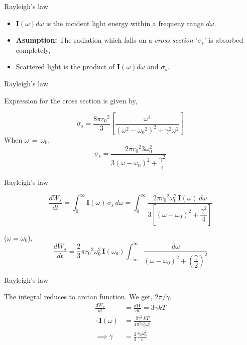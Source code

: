 \documentclass[aspectratio=169]{beamer}
\begin{document}
\begin{frame}{Rayleigh's law}
	
	\begin{itemize}
		
		\item  $ \mathbf{I}(\omega)d\omega $ is the incident light energy within a frequeny range $d\omega$. \newline
		\item \textbf{Asumption:} The radiation which falls on a \textit{cross section} '$\sigma_s$' is absorbed completely, \newline
		\item Scattered light is the product of $ \mathbf{I}(\omega)d\omega $ and $ \sigma_s $.

	\end{itemize}
	
\end{frame}
			
\begin{frame}{Rayleigh's law}
	\begin{center}
		Expression for the cross section is given by,
	\end{center}
	
	{\large \[ \sigma_s = \frac{8\pi {r_0}^{2}}{3} \left[ \frac{\omega^{4}}{(\omega^2-{\omega_0}^{2})^2+\gamma^2 \omega^2}\right] \]}\newline
	When $ \omega\,=\,\omega_0 $, \newline 		
	{\large \[ \sigma_s = \frac{2\pi {r_0}^{2}{3} \omega_0^{2}}{3(\omega-\omega_0)^2+\dfrac{\gamma^2}{4}} \]}
	
\end{frame}
				
\begin{frame}{Rayleigh's law}

	\[ \frac{dW_s}{dt}=\int_0^{\infty}{\mathbf{I}(\omega)\,\sigma_s \, d\omega} = \int_0^{\infty}{\frac{2\pi {r_0}^{2} \omega_0^{2} \, \mathbf{I}(\omega)\, d\omega}{3 \left[ (\omega-\omega_0)^2+\dfrac{\gamma^2}{4} \right] }} \] \newline

	 \because ($\omega =\omega_0 $), 
	\[ \frac{dW_s}{dt}= \frac{2}{3}\pi {r_0}^{2} \omega_0^{2} \, \mathbf{I}(\omega_0) \int_{-\infty}^{\infty}{\frac{d\omega}{(\omega-\omega_0)^2+{\left(  \dfrac{\gamma}{2} \right)}^{2}}}  \]

\end{frame}

\begin{frame}{Rayleigh's law}\vspace{1cm}

	The integral reduces to arctan function. We get, $2\pi / \gamma$. 
		\begin{align*}
			\frac{dW_s}{dt} &= \frac{dW}{dt} = 3 \gamma kT \\[2ex]
			\therefore \mathbf{I}(\omega) &= \frac{9\gamma^2\,kT}{4\pi^2 r_0^2\omega_0^2} \\[2ex]
			\implies \gamma &= \frac{2}{3} \frac{r_0 \omega_0^2}{c}
		\end{align*}
	
\end{frame}
\end{document}
